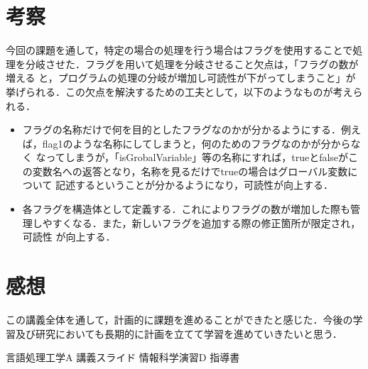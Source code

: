 \documentclass[dvipdfmx]{jarticle}
\begin{document}
\section{考察}
今回の課題を通して，特定の場合の処理を行う場合はフラグを使用することで処理を分岐させた．フラグを用いて処理を分岐させること欠点は，「フラグの数が増える
と，プログラムの処理の分岐が増加し可読性が下がってしまうこと」が挙げられる．この欠点を解決するための工夫として，以下のようなものが考えられる．
\begin{itemize}
  \item フラグの名称だけで何を目的としたフラグなのかが分かるようにする．例えば，flag1のような名称にしてしまうと，何のためのフラグなのかが分からなく
  なってしまうが，「isGrobalVariable」等の名称にすれば，trueとfalseがこの変数名への返答となり，名称を見るだけでtrueの場合はグローバル変数について
  記述するということが分かるようになり，可読性が向上する．
  \item 各フラグを構造体として定義する．これによりフラグの数が増加した際も管理しやすくなる．また，新しいフラグを追加する際の修正箇所が限定され，可読性
  が向上する．
\end{itemize}

\section{感想}
この講義全体を通して，計画的に課題を進めることができたと感じた．今後の学習及び研究においても長期的に計画を立てて学習を進めていきたいと思う．
\begin{thebibliography}{99}
     言語処理工学A 講義スライド
     情報科学演習D 指導書
\end{thebibliography}
\end{document}
